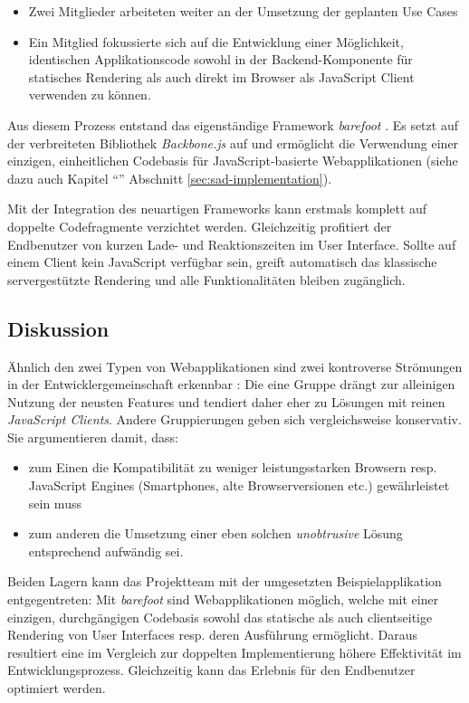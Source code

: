 \begin{itemize}
	\item Zwei Mitglieder arbeiteten weiter an der Umsetzung der geplanten Use Cases
	\item Ein Mitglied fokussierte sich auf die Entwicklung einer Möglichkeit, identischen Applikationscode sowohl in der Backend-Komponente für statisches Rendering als auch direkt im Browser als JavaScript Client verwenden zu können.
\end{itemize}

Aus diesem Prozess entstand das eigenständige Framework \emph{barefoot} \cite{Barefoot}. Es setzt auf der verbreiteten Bibliothek \emph{Backbone.js} \cite{Backbonejs} auf und ermöglicht die Verwendung einer einzigen, einheitlichen Codebasis für JavaScript-basierte Webapplikationen (siehe dazu auch Kapitel ``'' Abschnitt \ref{sec:sad-implementation}).

Mit der Integration des neuartigen Frameworks kann erstmals komplett auf doppelte Codefragmente verzichtet werden. Gleichzeitig profitiert der Endbenutzer von kurzen Lade- und Reaktionszeiten im User Interface. Sollte auf einem Client kein JavaScript verfügbar sein, greift automatisch das klassische servergestützte Rendering und alle Funktionalitäten bleiben zugänglich.


\subsection*{Diskussion}

Ähnlich den zwei Typen von Webapplikationen sind zwei kontroverse Strömungen in der Entwicklergemeinschaft erkennbar \cite{StackOverflowUnobtrusiveJavascriptOutdated}: Die eine Gruppe drängt zur alleinigen Nutzung der neusten Features und tendiert daher eher zu Lösungen mit reinen \emph{JavaScript Clients}. Andere Gruppierungen geben sich vergleichsweise konservativ. Sie argumentieren damit, dass:

\begin{itemize}
	\item zum Einen die Kompatibilität zu weniger leistungsstarken Browsern resp. JavaScript Engines (Smartphones, alte Browserversionen etc.) gewährleistet sein muss
	\item zum anderen die Umsetzung einer eben solchen \emph{unobtrusive} Lösung entsprechend aufwändig sei.
\end{itemize}

Beiden Lagern kann das Projektteam mit der umgesetzten Beispielapplikation entgegentreten: Mit \emph{barefoot} sind Webapplikationen möglich, welche mit einer einzigen, durchgängigen Codebasis sowohl das statische als auch clientseitige Rendering von User Interfaces resp. deren Ausführung ermöglicht. Daraus resultiert eine im Vergleich zur doppelten Implementierung höhere Effektivität im Entwicklungsprozess. Gleichzeitig kann das Erlebnis für den Endbenutzer optimiert werden.

